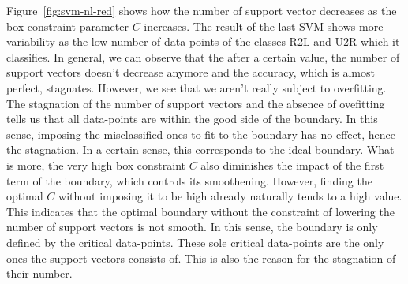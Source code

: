Figure~\ref{fig:svm-nl-red} shows how the number of support vector decreases as the box constraint parameter $C$ increases. The result of the last SVM shows more variability as the low number of data-points of the classes R2L and U2R which it classifies. In general, we can observe that the after a certain value, the number of support vectors doesn't decrease anymore and the accuracy, which is almost perfect, stagnates. However, we see that we aren't really subject to overfitting. The stagnation of the number of support vectors and the absence of ovefitting tells us that all data-points are within the good side of the boundary. In this sense, imposing the misclassified ones to fit to the boundary has no effect, hence the stagnation. In a certain sense, this corresponds to the ideal boundary. What is more, the very high box constraint $C$ also diminishes the impact of the first term of the boundary, which controls its smoothening. However, finding the optimal $C$ without imposing it to be high already naturally tends to a high value. This indicates that the optimal boundary without the constraint of lowering the number of support vectors is not smooth. In this sense, the boundary is only defined by the critical data-points. These sole critical data-points are the only ones the support vectors consists of. This is also the reason for the stagnation of their number.

